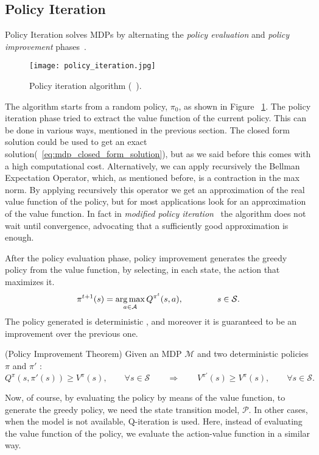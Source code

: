 \subsection{Policy Iteration}
Policy Iteration solves MDPs by alternating the \emph{policy evaluation} and \emph{policy improvement} phases~\cite{howard:dynamic60}.
\begin{figure}
  \texttt{[image: policy\_iteration.jpg]}
  \caption{Policy iteration algorithm (~\cite{Sutton:1998:IRL:551283}).}
  \label{fig:policy_iteration}
\end{figure}
The algorithm starts from a random policy, $\pi_0$, as shown in Figure ~\ref{fig:policy_iteration}. The policy iteration phase tried to extract the value function of the current policy. This can be done in various ways, mentioned in the previous section. The closed form solution could be used to get an exact solution(~\ref{eq:mdp_closed_form_solution}), but as we said before this comes with a high computational cost. Alternatively, we can apply recursively the Bellman Expectation Operator, which, as mentioned before, is a contraction in the max norm. By applying recursively this operator we get an approximation of the real value function of the policy, but for most applications look for an approximation of the value function. In fact in \emph{modified policy iteration}~\cite{Puterman:1978:MPI:2828482.2828486} the algorithm does not wait until convergence, advocating that a sufficiently good approximation is enough.\par
After the policy evaluation phase, policy improvement generates the greedy policy from the value function, by selecting, in each state, the action that maximizes it.
\begin{equation}
	\pi^{t+1}(s)=\operatorname*{arg\,max}_{a \in \mathcal{A}} Q^{\pi^t}(s,a), \qquad \qquad s \in \mathcal{S}.
\end{equation}
The policy generated is deterministic , and moreover it is guaranteed to be an improvement over the previous one.
\begin{theorem}
(Policy Improvement Theorem) Given an MDP $\mathcal{M}$ and two deterministic policies $\pi$ and $\pi′$ :
\begin{equation*}
	Q^\pi(s,\pi'(s)) \geq V^\pi(s), \qquad \forall s \in \mathcal{S} \qquad \Rightarrow \qquad V^{\pi'}(s) \geq V^\pi(s),	\qquad \forall s \in \mathcal{S}.
\end{equation*}
\end{theorem}
Now, of course, by evaluating the policy by means of the value function, to generate the greedy policy, we need the state transition model, $\mathcal{P}$. In other cases, when the model is not available, Q-iteration is used. Here, instead of evaluating the value function of the policy, we evaluate the action-value function in a similar way.
